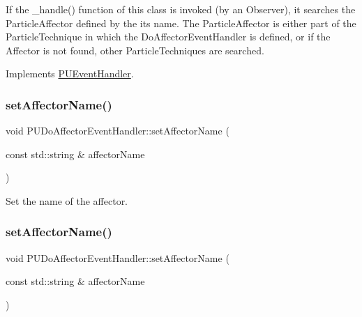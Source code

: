 If the \+\_\+handle() function of this class is invoked (by an Observer), it searches the Particle\+Affector defined by the its name. The Particle\+Affector is either part of the Particle\+Technique in which the Do\+Affector\+Event\+Handler is defined, or if the Affector is not found, other Particle\+Techniques are searched. 

Implements \hyperlink{classPUEventHandler_a760172609708c65548dcac364c9b3b9c}{P\+U\+Event\+Handler}.

\mbox{\label{classPUDoAffectorEventHandler_af784f76a5eaf5b3d073a0d0ee168ec89}} 
\subsubsection{\texorpdfstring{set\+Affector\+Name()}{setAffectorName()}\hspace{0.1cm}{\footnotesize\ttfamily [1/2]}}
{\footnotesize\ttfamily void P\+U\+Do\+Affector\+Event\+Handler\+::set\+Affector\+Name (\begin{DoxyParamCaption}\item[{const std\+::string \&}]{affector\+Name }\end{DoxyParamCaption})\hspace{0.3cm}{\ttfamily [inline]}}

Set the name of the affector. \mbox{\label{classPUDoAffectorEventHandler_af784f76a5eaf5b3d073a0d0ee168ec89}} 
\subsubsection{\texorpdfstring{set\+Affector\+Name()}{setAffectorName()}\hspace{0.1cm}{\footnotesize\ttfamily [2/2]}}
{\footnotesize\ttfamily void P\+U\+Do\+Affector\+Event\+Handler\+::set\+Affector\+Name (\begin{DoxyParamCaption}\item[{const std\+::string \&}]{affector\+Name }\end{DoxyParamCaption})\hspace{0.3cm}{\ttfamily [inline]}}


